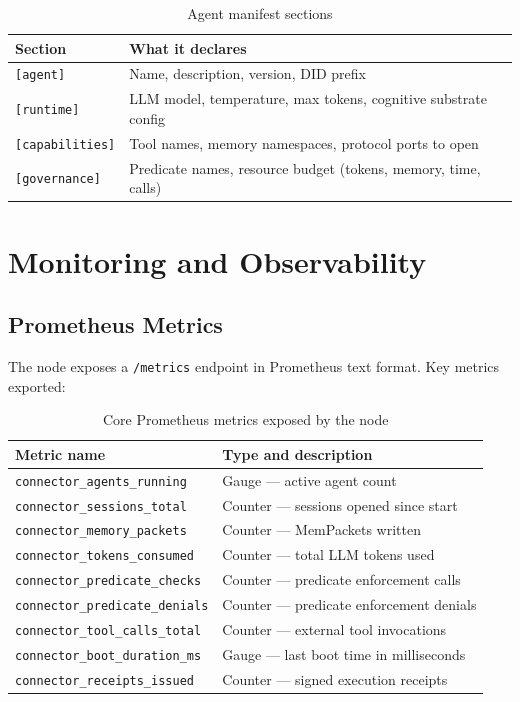 \begin{table}[H]
\centering
\renewcommand{\arraystretch}{1.4}
\begin{tabularx}{\textwidth}{@{}lX@{}}
\toprule
\textbf{Section} & \textbf{What it declares} \\
\midrule
\texttt{[agent]}       & Name, description, version, DID prefix \\
\texttt{[runtime]}     & LLM model, temperature, max tokens, cognitive substrate config \\
\texttt{[capabilities]}& Tool names, memory namespaces, protocol ports to open \\
\texttt{[governance]}  & Predicate names, resource budget (tokens, memory, time, calls) \\
\bottomrule
\end{tabularx}
\caption{Agent manifest sections}
\end{table}

\section{Monitoring and Observability}

\subsection{Prometheus Metrics}

The node exposes a \texttt{/metrics} endpoint in Prometheus text format.
Key metrics exported:

\begin{table}[H]
\centering
\renewcommand{\arraystretch}{1.4}
\begin{tabular}{@{}ll@{}}
\toprule
\textbf{Metric name} & \textbf{Type and description} \\
\midrule
\texttt{connector\_agents\_running}     & Gauge — active agent count \\
\texttt{connector\_sessions\_total}     & Counter — sessions opened since start \\
\texttt{connector\_memory\_packets}     & Counter — MemPackets written \\
\texttt{connector\_tokens\_consumed}    & Counter — total LLM tokens used \\
\texttt{connector\_predicate\_checks}   & Counter — predicate enforcement calls \\
\texttt{connector\_predicate\_denials}  & Counter — predicate enforcement denials \\
\texttt{connector\_tool\_calls\_total}  & Counter — external tool invocations \\
\texttt{connector\_boot\_duration\_ms}  & Gauge — last boot time in milliseconds \\
\texttt{connector\_receipts\_issued}    & Counter — signed execution receipts \\
\bottomrule
\end{tabular}
\caption{Core Prometheus metrics exposed by the node}
\end{table}

